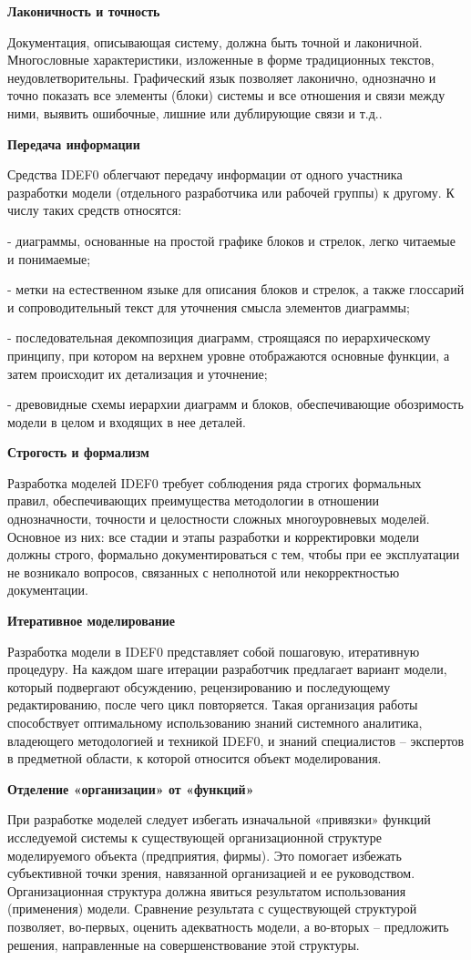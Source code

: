 \documentclass[a4paper, final]{article}
\begin{document}
\par \textbf{Лаконичность и точность} 
\par Документация, описывающая систему, должна быть точной и лаконичной. Многословные характеристики, изложенные в форме традиционных текстов, неудовлетворительны. Графический язык позволяет лаконично, однозначно и точно показать все элементы (блоки) системы и все отношения и связи между ними, выявить ошибочные, лишние или дублирующие связи и т.д..
\par \textbf{Передача информации} 
\par Средства IDEF0 облегчают передачу информации от одного участника разработки модели (отдельного разработчика или рабочей группы) к другому. К числу таких средств относятся:
\par- диаграммы, основанные на простой графике блоков и стрелок, легко читаемые и понимаемые;
\par- метки на естественном языке для описания блоков и стрелок, а также глоссарий и сопроводительный текст для уточнения смысла элементов диаграммы;
\par- последовательная декомпозиция диаграмм, строящаяся по иерархическому принципу, при котором на верхнем уровне отображаются основные функции, а затем происходит их детализация и уточнение;
\par- древовидные схемы иерархии диаграмм и блоков, обеспечивающие обозримость модели в целом и входящих в нее деталей.


\newpage
\par \textbf{Строгость и формализм} 
\par Разработка моделей IDEF0 требует соблюдения ряда строгих формальных правил, обеспечивающих преимущества
методологии в отношении однозначности, точности и целостности сложных многоуровневых моделей. Основное из них: все стадии и этапы разработки и корректировки модели должны строго, формально документироваться с тем, чтобы при ее эксплуатации не возникало вопросов, связанных с неполнотой или некорректностью документации.
\par \textbf{Итеративное моделирование} 
\par Разработка модели в IDEF0 представляет собой пошаговую, итеративную процедуру. На каждом шаге итерации разработчик предлагает вариант модели, который подвергают обсуждению, рецензированию и последующему редактированию, после чего цикл
повторяется. Такая организация работы способствует оптимальному использованию знаний системного аналитика, владеющего методологией и техникой IDEF0, и знаний специалистов – экспертов в предметной области, к которой относится объект моделирования.
\par \textbf{Отделение «организации» от «функций»}
\par При разработке моделей следует избегать изначальной «привязки» функций исследуемой системы к существующей организационной структуре моделируемого объекта (предприятия, фирмы). Это помогает избежать субъективной точки зрения, навязанной организацией и ее руководством. Организационная
структура должна явиться результатом использования (применения) модели. Сравнение результата с существующей структурой позволяет, во-первых, оценить адекватность модели, а во-вторых – предложить решения, направленные на совершенствование этой структуры.
\newpage
\end{document}
